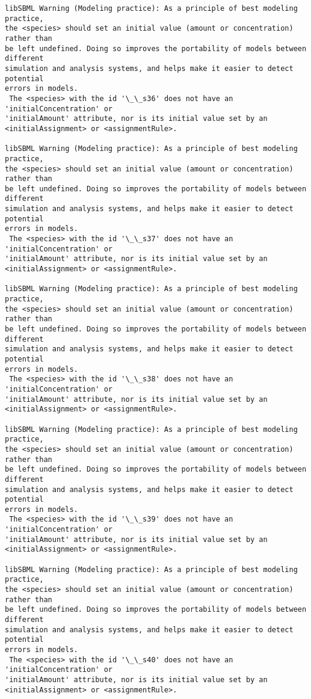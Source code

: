 \documentclass[11pt]{article}
\begin{document}
\begin{Verbatim}[commandchars=\\\{\}]
libSBML Warning (Modeling practice): As a principle of best modeling practice,
the <species> should set an initial value (amount or concentration) rather than
be left undefined. Doing so improves the portability of models between different
simulation and analysis systems, and helps make it easier to detect potential
errors in models.
 The <species> with the id '\_\_s36' does not have an 'initialConcentration' or
'initialAmount' attribute, nor is its initial value set by an
<initialAssignment> or <assignmentRule>.

libSBML Warning (Modeling practice): As a principle of best modeling practice,
the <species> should set an initial value (amount or concentration) rather than
be left undefined. Doing so improves the portability of models between different
simulation and analysis systems, and helps make it easier to detect potential
errors in models.
 The <species> with the id '\_\_s37' does not have an 'initialConcentration' or
'initialAmount' attribute, nor is its initial value set by an
<initialAssignment> or <assignmentRule>.

libSBML Warning (Modeling practice): As a principle of best modeling practice,
the <species> should set an initial value (amount or concentration) rather than
be left undefined. Doing so improves the portability of models between different
simulation and analysis systems, and helps make it easier to detect potential
errors in models.
 The <species> with the id '\_\_s38' does not have an 'initialConcentration' or
'initialAmount' attribute, nor is its initial value set by an
<initialAssignment> or <assignmentRule>.

libSBML Warning (Modeling practice): As a principle of best modeling practice,
the <species> should set an initial value (amount or concentration) rather than
be left undefined. Doing so improves the portability of models between different
simulation and analysis systems, and helps make it easier to detect potential
errors in models.
 The <species> with the id '\_\_s39' does not have an 'initialConcentration' or
'initialAmount' attribute, nor is its initial value set by an
<initialAssignment> or <assignmentRule>.

libSBML Warning (Modeling practice): As a principle of best modeling practice,
the <species> should set an initial value (amount or concentration) rather than
be left undefined. Doing so improves the portability of models between different
simulation and analysis systems, and helps make it easier to detect potential
errors in models.
 The <species> with the id '\_\_s40' does not have an 'initialConcentration' or
'initialAmount' attribute, nor is its initial value set by an
<initialAssignment> or <assignmentRule>.


\end{Verbatim}
\end{document}
